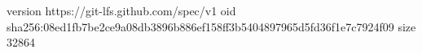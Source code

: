 version https://git-lfs.github.com/spec/v1
oid sha256:08ed1fb7be2ce9a08db3896b886ef158ff3b5404897965d5fd36f1e7c7924f09
size 32864

